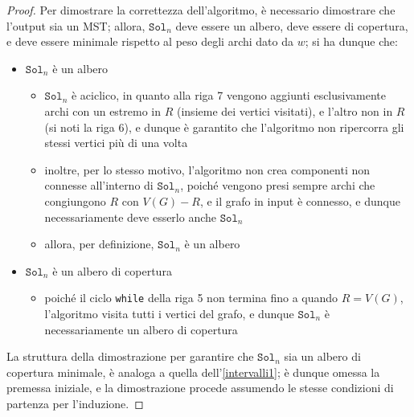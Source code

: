 \documentclass[14pt]{extreport}
\theoremstyle{definition}
\theoremstyle{definition}
\begin{document}
\begin{proof}
    Per dimostrare la correttezza dell'algoritmo, è necessario dimostrare che l'output sia un MST; allora, $\texttt{Sol}_n$ deve essere un albero, deve essere di copertura, e deve essere minimale rispetto al peso degli archi dato da $w$; si ha dunque che:

    \begin{itemize}
        \item $\texttt{Sol}_n$ è un albero
            \begin{itemize}
                \item $\texttt{Sol}_n$ è aciclico, in quanto alla riga 7 vengono aggiunti esclusivamente archi con un estremo in $R$ (insieme dei vertici visitati), e l'altro non in $R$ (si noti la riga 6), e dunque è garantito che l'algoritmo non ripercorra gli stessi vertici più di una volta
                \item inoltre, per lo stesso motivo, l'algoritmo non crea componenti non connesse all'interno di $\texttt{Sol}_n$, poiché vengono presi sempre archi che congiungono $R$ con $V(G) - R$, e il grafo in input è connesso, e dunque necessariamente deve esserlo anche $\texttt{Sol}_n$
                \item allora, per definizione, $\texttt{Sol}_n$ è un albero
            \end{itemize}
        \item $\texttt{Sol}_n$ è un albero di copertura
            \begin{itemize}
                \item poiché il ciclo \texttt{while} della riga 5 non termina fino a quando $R = V(G)$, l'algoritmo visita tutti i vertici del grafo, e dunque $\texttt{Sol}_n$ è necessariamente un albero di copertura
            \end{itemize}
    \end{itemize}

    La struttura della dimostrazione per garantire che $\texttt{Sol}_n$ sia un albero di copertura minimale, è analoga a quella dell'\cref{intervalli1}; è dunque omessa la premessa iniziale, e la dimostrazione procede assumendo le stesse condizioni di partenza per l'induzione.


\end{proof}
\end{document}
